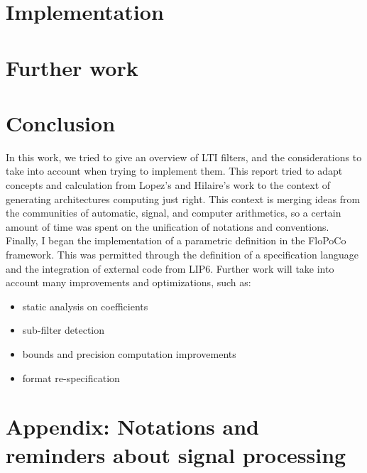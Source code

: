 \documentclass[twoside]{article}
\theoremstyle{remark}
\numberwithin{equation}{subsection}
\newcommand{\TODO}{\textbf{TODO}}
\begin{document}
\newpage
\section{Implementation}
\label{Part2}


\newpage
\section{Further work}
\label{Part3}


\newpage
\section*{Conclusion}
	In this work, we tried to give an overview of LTI filters, and the considerations to take into account when trying to implement them.
	This report tried to adapt concepts and calculation from Lopez's and Hilaire's work to the context of generating architectures computing just right.
	This context is merging ideas from the communities of automatic, signal, and computer arithmetics, so a certain amount of time was spent on the unification of notations and conventions.
	Finally, I began the implementation of a parametric definition in the FloPoCo framework.
	This was permitted through the definition of a specification language and the integration of external code from LIP6.
	Further work will take into account many improvements and optimizations, such as:
	\begin{itemize}
		\item static analysis on coefficients
		\item sub-filter detection
		\item bounds and precision computation improvements
		\item format re-specification
	\end{itemize}


\newpage
\section*{Appendix: Notations and reminders about signal processing}

\end{document}
